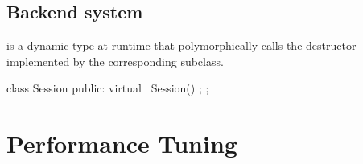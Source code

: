 \begin{content}
\subsection{Backend system}
 is a dynamic type at runtime that polymorphically calls the destructor implemented by the corresponding subclass.

\begin{leftbar}
\begin{c++}[caption={tensorflow/core/common\_runtime/session.h}]
class Session {
public:
  virtual ~Session() {};
};
\end{c++}
\end{leftbar}

\end{content}


\section{Performance Tuning}
